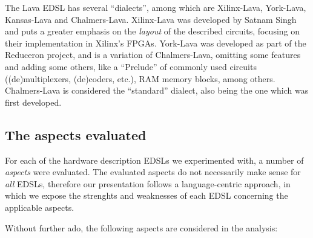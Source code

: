 \documentclass[a4paper]{article}
\begin{document}
            The Lava EDSL has several ``dialects'', among which are Xilinx-Lava, York-Lava,
            Kansas-Lava and Chalmers-Lava. Xilinx-Lava was developed by Satnam Singh and puts a
            greater emphasis on the \emph{layout} of the described circuits, focusing on their
            implementation in Xilinx's FPGAs. York-Lava was developed as part of the Reduceron
            project, and is a variation of Chalmers-Lava, omitting some features and adding some
            others, like a ``Prelude'' of commonly used circuits ((de)multiplexers, (de)coders,
            etc.), RAM memory blocks, among others. Chalmers-Lava is considered the ``standard''
            dialect, also being the one which was first developed.


        \subsection{The aspects evaluated}
        \label{subsec:aspects}
            For each of the hardware description EDSLs we experimented with, a number of
            \emph{aspects} were evaluated. The evaluated aspects do not necessarily make sense for
            \emph{all} EDSLs, therefore our presentation follows a language-centric approach, in
            which we expose the strenghts and weaknesses of each EDSL concerning the applicable
            aspects.

            Without further ado, the following aspects are considered in the analysis:
\end{document}
